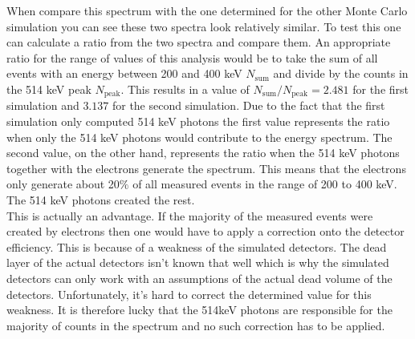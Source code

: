 \documentclass[encoding=utf8,british]{tumphthesis}
\begin{document}
When compare this spectrum with the one determined for the other Monte Carlo simulation you can see these two spectra look relatively similar.
To test this one can calculate a ratio from the two spectra and compare them.
An appropriate ratio for the range of values of this analysis would be to take the sum of all events with an energy between 200 and 400 keV $N_{\mathrm{sum}}$ and divide by the counts in the 514 keV peak $N_ {\mathrm{peak}}$.
This results in a value of $N_{\mathrm{sum}}/N_{\mathrm{peak}} = 2.481$ for the first simulation and $3.137$ for the second simulation.
Due to the fact that the first simulation only computed 514 keV photons the first value represents the ratio when only the 514 keV photons would contribute to the energy spectrum.
The second value, on the other hand, represents the ratio when the 514 keV photons together with the electrons generate the spectrum.
This means that the electrons only generate about 20$\%$ of all measured events in the range of 200 to 400 keV.
The 514 keV photons created the rest.
\\

This is actually an advantage.
If the majority of the measured events were created by electrons then one would have to apply a correction onto the detector efficiency.
This is because of a weakness of the simulated detectors.
The dead layer of the actual detectors isn't known that well which is why the simulated detectors can only work with an assumptions of the actual dead volume of the detectors.
Unfortunately, it's hard to correct the determined value for this weakness.
It is therefore lucky that the 514keV photons are responsible for the majority of counts in the spectrum and no such correction has to be applied.
\\
\end{document}
